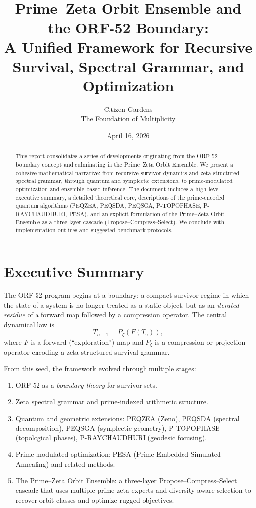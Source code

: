 \documentclass[11pt]{article}
\title{Prime--Zeta Orbit Ensemble and the ORF-52 Boundary:\\
A Unified Framework for Recursive Survival, Spectral Grammar, and Optimization}
\author{Citizen Gardens \\ The Foundation of Multiplicity}
\date{April 16, 2026}
\theoremstyle{definition}
\theoremstyle{plain}
\theoremstyle{remark}
\begin{document}
\maketitle

\begin{abstract}
This report consolidates a series of developments originating from the ORF-52 boundary concept and culminating in the Prime--Zeta Orbit Ensemble. We present a cohesive mathematical narrative: from recursive survivor dynamics and zeta-structured spectral grammar, through quantum and symplectic extensions, to prime-modulated optimization and ensemble-based inference. The document includes a high-level executive summary, a detailed theoretical core, descriptions of the prime-encoded quantum algorithms (PEQZEA, PEQSDA, PEQSGA, P-TOPOPHASE, P-RAYCHAUDHURI, PESA), and an explicit formulation of the Prime--Zeta Orbit Ensemble as a three-layer cascade (Propose--Compress--Select). We conclude with implementation outlines and suggested benchmark protocols.
\end{abstract}
\newpage        
\tableofcontents
\newpage
\section{Executive Summary}

The ORF-52 program begins at a boundary: a compact survivor regime in which the state of a system is no longer treated as a static object, but as an \emph{iterated residue} of a forward map followed by a compression operator. The central dynamical law is
\[
T_{n+1} = P_\zeta(F(T_n)),
\]
where $F$ is a forward (``exploration'') map and $P_\zeta$ is a compression or projection operator encoding a zeta-structured survival grammar.

From this seed, the framework evolved through multiple stages:
\begin{enumerate}[label=(\roman*)]
  \item ORF-52 as a \emph{boundary theory} for survivor sets.
  \item Zeta spectral grammar and prime-indexed arithmetic structure.
  \item Quantum and geometric extensions: PEQZEA (Zeno), PEQSDA (spectral decomposition), PEQSGA (symplectic geometry), P-TOPOPHASE (topological phases), P-RAYCHAUDHURI (geodesic focusing).
  \item Prime-modulated optimization: PESA (Prime-Embedded Simulated Annealing) and related methods.
  \item The Prime--Zeta Orbit Ensemble: a three-layer Propose--Compress--Select cascade that uses multiple prime-zeta experts and diversity-aware selection to recover orbit classes and optimize rugged objectives.
\end{enumerate}
\end{document}
